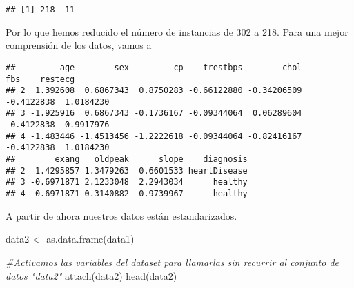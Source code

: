 \documentclass[
]{article}
\newenvironment{Shaded}{\begin{snugshade}}{\end{snugshade}}
\newcommand{\CommentTok}[1]{\textcolor[rgb]{0.56,0.35,0.01}{\textit{#1}}}
\newcommand{\DecValTok}[1]{\textcolor[rgb]{0.00,0.00,0.81}{#1}}
\newcommand{\FunctionTok}[1]{\textcolor[rgb]{0.00,0.00,0.00}{#1}}
\newcommand{\NormalTok}[1]{#1}
\newcommand{\OtherTok}[1]{\textcolor[rgb]{0.56,0.35,0.01}{#1}}
\newcommand{\SpecialCharTok}[1]{\textcolor[rgb]{0.00,0.00,0.00}{#1}}
\newcommand{\StringTok}[1]{\textcolor[rgb]{0.31,0.60,0.02}{#1}}
\begin{document}
\begin{verbatim}
## [1] 218  11
\end{verbatim}

Por lo que hemos reducido el número de instancias de 302 a 218. Para una
mejor comprensión de los datos, vamos a

\begin{Shaded}
\end{Shaded}

\begin{verbatim}
##         age        sex         cp    trestbps        chol        fbs    restecg
## 2  1.392608  0.6867343  0.8750283 -0.66122880 -0.34206509 -0.4122838  1.0184230
## 3 -1.925916  0.6867343 -0.1736167 -0.09344064  0.06289604 -0.4122838 -0.9917976
## 4 -1.483446 -1.4513456 -1.2222618 -0.09344064 -0.82416167 -0.4122838  1.0184230
##        exang   oldpeak      slope    diagnosis
## 2  1.4295857 1.3479263  0.6601533 heartDisease
## 3 -0.6971871 2.1233048  2.2943034      healthy
## 4 -0.6971871 0.3140882 -0.9739967      healthy
\end{verbatim}

A partir de ahora nuestros datos están estandarizados.

\begin{Shaded}
\begin{Highlighting}[]
\NormalTok{data2 }\OtherTok{\textless{}{-}} \FunctionTok{as.data.frame}\NormalTok{(data1)}

\CommentTok{\#Activamos las variables del dataset para llamarlas sin recurrir al conjunto de datos "data2"}
\FunctionTok{attach}\NormalTok{(data2)}
\FunctionTok{head}\NormalTok{(data2)}
\end{Highlighting}
\end{Shaded}
\end{document}
